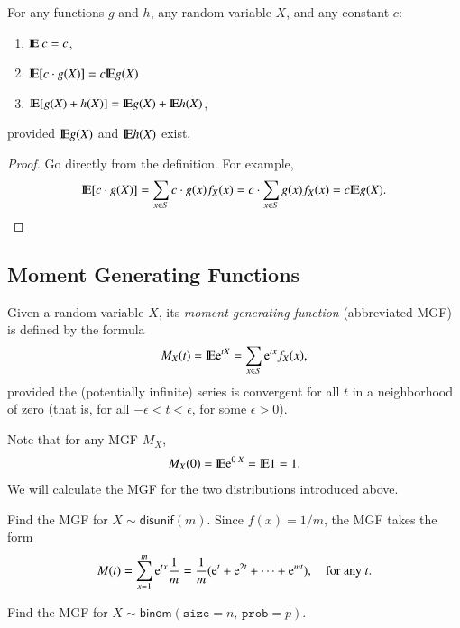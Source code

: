 \documentclass[captions=tableheading]{scrbook}
\begin{document}
\begin{prop}
\label{pro:expectation-properties}
For any functions \(g\) and \(h\), any random variable \(X\), and any constant \(c\): 
\begin{enumerate}
\item \(\mathrm{I\hspace{-1.5pt}E}\: c=c\),
\item \(\mathrm{I\hspace{-1.5pt}E}[c\cdot g(X)]=c\mathrm{I\hspace{-1.5pt}E} g(X)\)
\item \(\mathrm{I\hspace{-1.5pt}E}[g(X)+h(X)]=\mathrm{I\hspace{-1.5pt}E} g(X)+\mathrm{I\hspace{-1.5pt}E} h(X)\),
\end{enumerate}
provided \(\mathrm{I\hspace{-1.5pt}E} g(X)\) and \(\mathrm{I\hspace{-1.5pt}E} h(X)\) exist.
\end{prop}

\begin{proof}
Go directly from the definition. For example,
\[
\mathrm{I\hspace{-1.5pt}E}[c\cdot g(X)]=\sum_{x\in S}c\cdot g(x)f_{X}(x)=c\cdot\sum_{x\in S}g(x)f_{X}(x)=c\mathrm{I\hspace{-1.5pt}E} g(X).
\]
\end{proof}
\subsection{Moment Generating Functions}
\label{sec-5-4-2}

\label{sub:MGFs}

\begin{defn}
Given a random variable \(X\), its \emph{moment generating function} (abbreviated MGF) is defined by the formula
\begin{equation}
M_{X}(t)=\mathrm{I\hspace{-1.5pt}E}\mathrm{e}^{tX}=\sum_{x\in S}\mathrm{e}^{tx}f_{X}(x),
\end{equation}
provided the (potentially infinite) series is convergent for all \(t\) in a neighborhood of zero (that is, for all \(-\epsilon<t<\epsilon\), for some \(\epsilon>0\)).
\end{defn}

Note that for any MGF \(M_{X}\),
\begin{equation}
M_{X}(0)=\mathrm{I\hspace{-1.5pt}E}\mathrm{e}^{0\cdot X}=\mathrm{I\hspace{-1.5pt}E}1=1.
\end{equation}
We will calculate the MGF for the two distributions introduced above.

\begin{example}
Find the MGF for \(X\sim\mathsf{disunif}(m)\). 
Since \(f(x)=1/m\), the MGF takes the form
\[
M(t)=\sum_{x=1}^{m}\mathrm{e}^{tx}\frac{1}{m}=\frac{1}{m}(\mathrm{e}^{t}+\mathrm{e}^{2t}+\cdots+\mathrm{e}^{mt}),\quad\mbox{for any \ensuremath{t}.}
\]

\end{example}

\begin{example}
Find the MGF for \(X\sim\mathsf{binom}(\mathtt{size}=n,\,\mathtt{prob}=p)\).
\end{example}
\end{document}
